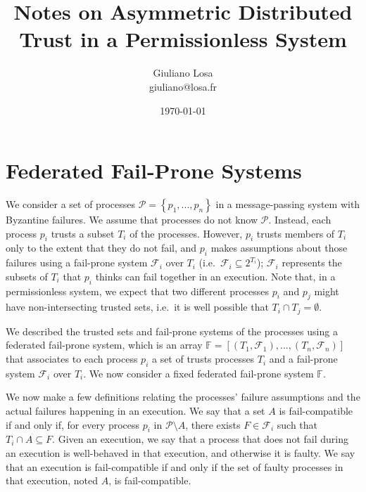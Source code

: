 \documentclass[11pt,letterpaper]{article}
\title{Notes on Asymmetric Distributed Trust in a Permissionless System}
\date{\today}
\author{Giuliano Losa\\giuliano@losa.fr}
\begin{document}
\maketitle

\section{Federated Fail-Prone Systems}
\label{sec:basic}

We consider a set of processes $\mathcal{P}=\left\{p_1,...,p_n\right\}$ in a message-passing system with Byzantine failures.
We assume that processes do not know $\mathcal{P}$.
Instead, each process $p_i$ trusts a subset $T_i$ of the processes.
However, $p_i$ trusts members of $T_i$ only to the extent that they do not fail, and $p_i$ makes assumptions about those failures using a fail-prone system $\mathcal{F}_i$ over $T_i$ (i.e.\ $\mathcal{F}_i\subseteq 2^{T_i}$);
$\mathcal{F}_i$ represents the subsets of $T_i$ that $p_i$ thinks can fail together in an execution.
Note that, in a permissionless system, we expect that two different processes $p_i$ and $p_j$ might have non-intersecting trusted sets, i.e.\ it is well possible that $T_i\cap T_j=\emptyset$.

We described the trusted sets and fail-prone systems of the processes using a federated fail-prone system, which is an array $\mathbb{F}=\left[\left(T_1,\mathcal{F}_1\right),...,\left(T_n,\mathcal{F}_n\right)\right]$ that associates to each process $p_i$ a set of trusts processes $T_i$ and a fail-prone system $\mathcal{F}_i$ over $T_i$.
We now consider a fixed federated fail-prone system $\mathbb{F}$.

We now make a few definitions relating the processes' failure assumptions and the actual failures happening in an execution.
We say that a set $A$ is fail-compatible if and only if, for every process $p_i$ in $\mathcal{P}\setminus A$, there exists $F\in\mathcal{F}_i$ such that $T_i\cap A \subseteq F$.
Given an execution, we say that a process that does not fail during an execution is well-behaved in that execution, and otherwise it is faulty.
We say that an execution is fail-compatible if and only if the set of faulty processes in that execution, noted $A$, is fail-compatible.
\end{document}
